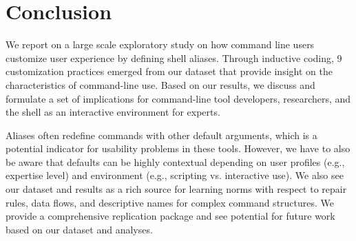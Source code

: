 \section{Conclusion}

We report on a large scale exploratory study on how command line users customize user experience by defining shell aliases.
Through inductive coding, 9 customization practices emerged from our dataset that provide insight on the characteristics of command-line use.
Based on our results, we discuss and formulate a set of implications for command-line tool developers, researchers, and the shell as an interactive environment for experts.

Aliases often redefine commands with other default arguments, which is a potential indicator for usability problems in these tools.
However, we have to also be aware that defaults can be highly contextual depending on user profiles (e.g., expertise level) and environment (e.g., scripting vs. interactive use).
We also see our dataset and results as a rich source for learning norms with respect to repair rules, data flows, and descriptive names for complex command structures.
We provide a comprehensive replication package and see potential for future work based on our dataset and analyses.